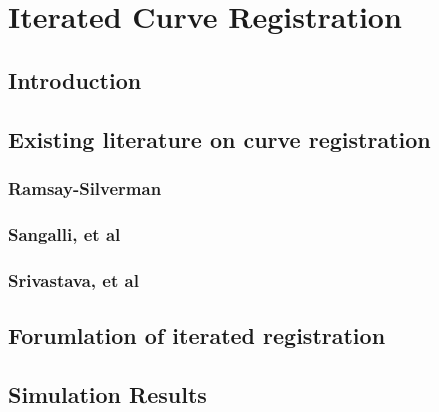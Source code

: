 \chapter{Iterated Curve Registration}

\section{Introduction}

\section{Existing literature on curve registration}
\subsection{Ramsay-Silverman}
\subsection{Sangalli, et al}
\subsection{Srivastava, et al}

\section{Forumlation of iterated registration}

\section{Simulation Results}


